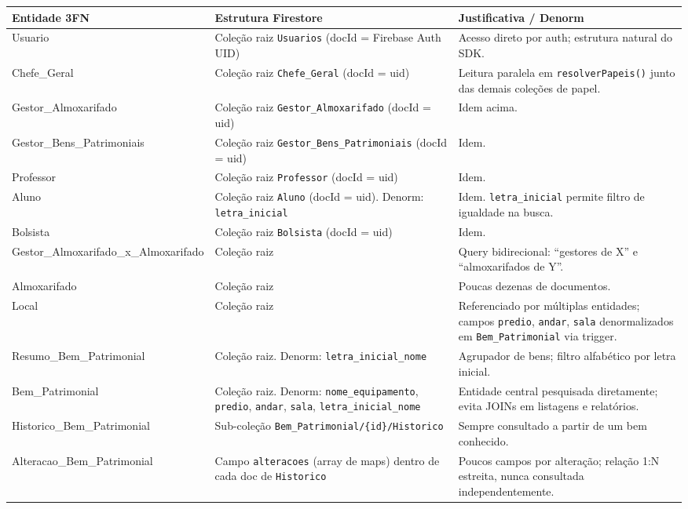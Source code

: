\documentclass[12pt,a4paper]{article}
\begin{document}
\begin{center}
\small
\begin{longtable}{>{\raggedright\arraybackslash}p{} >{\raggedright\arraybackslash}p{} >{\raggedright\arraybackslash}X}
\toprule
\textbf{Entidade 3FN} & \textbf{Estrutura Firestore} & \textbf{Justificativa / Denorm}\\
\midrule
\endhead
\bottomrule
\endfoot
Usuario & Coleção raiz \texttt{Usuarios} (docId = Firebase Auth UID) & Acesso direto por auth; estrutura natural do SDK.\\
Chefe\_Geral & Coleção raiz \texttt{Chefe\_Geral} (docId = uid) & Leitura paralela em \texttt{resolverPapeis()} junto das demais coleções de papel.\\
Gestor\_Almoxarifado & Coleção raiz \texttt{Gestor\_Almoxarifado} (docId = uid) & Idem acima.\\
Gestor\_Bens\_Patrimoniais & Coleção raiz \texttt{Gestor\_Bens\_Patrimoniais} (docId = uid) & Idem.\\
Professor & Coleção raiz \texttt{Professor} (docId = uid) & Idem.\\
Aluno & Coleção raiz \texttt{Aluno} (docId = uid). Denorm: \texttt{letra\_inicial} & Idem. \texttt{letra\_inicial} permite filtro de igualdade na busca.\\
Bolsista & Coleção raiz \texttt{Bolsista} (docId = uid) & Idem.\\
Gestor\_Almoxarifado\_x\_Almoxarifado & Coleção raiz & Query bidirecional: ``gestores de X'' e ``almoxarifados de Y''.\\
Almoxarifado & Coleção raiz & Poucas dezenas de documentos.\\
Local & Coleção raiz & Referenciado por múltiplas entidades; campos \texttt{predio}, \texttt{andar}, \texttt{sala} denormalizados em \texttt{Bem\_Patrimonial} via trigger.\\
Resumo\_Bem\_Patrimonial & Coleção raiz. Denorm: \texttt{letra\_inicial\_nome} & Agrupador de bens; filtro alfabético por letra inicial.\\
Bem\_Patrimonial & Coleção raiz. Denorm: \texttt{nome\_equipamento}, \texttt{predio}, \texttt{andar}, \texttt{sala}, \texttt{letra\_inicial\_nome} & Entidade central pesquisada diretamente; evita JOINs em listagens e relatórios.\\
Historico\_Bem\_Patrimonial & Sub-coleção \texttt{Bem\_Patrimonial/\{id\}/Historico} & Sempre consultado a partir de um bem conhecido.\\
Alteracao\_Bem\_Patrimonial & Campo \texttt{alteracoes} (array de maps) dentro de cada doc de \texttt{Historico} & Poucos campos por alteração; relação 1:N estreita, nunca consultada independentemente.\\

\end{longtable}
\end{center}
\end{document}

